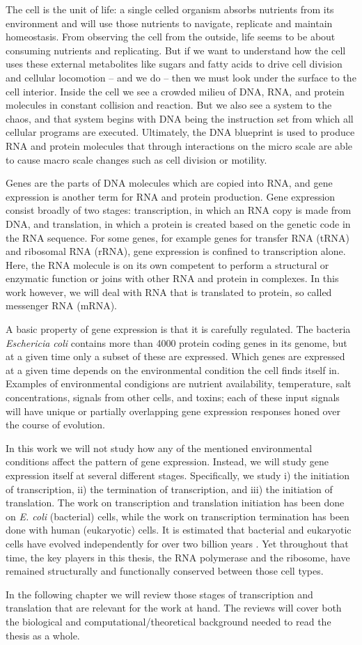%

The cell is the unit of life: a single celled organism absorbs nutrients from
its environment and will use those nutrients to navigate, replicate and
maintain homeostasis. From observing the cell from the outside, life seems to
be about consuming nutrients and replicating. But if we want to understand how
the cell uses these external metabolites like sugars and fatty acids to drive
cell division and cellular locomotion -- and we do -- then we must look under
the surface to the cell interior. Inside the cell we see a crowded milieu of
DNA, RNA, and protein molecules in constant collision and reaction. But we also
see a system to the chaos, and that system begins with DNA being the
instruction set from which all cellular programs are executed. Ultimately, the
DNA blueprint is used to produce RNA and protein molecules that through
interactions on the micro scale are able to cause macro scale changes such as
cell division or motility.

Genes are the parts of DNA molecules which are copied into RNA, and gene
expression is another term for RNA and protein production. Gene expression
consist broadly of two stages: transcription, in which an RNA copy is made from
DNA, and translation, in which a protein is created based on the genetic code
in the RNA sequence. For some genes, for example genes for transfer RNA (tRNA)
and ribosomal RNA (rRNA), gene expression is confined to transcription alone.
Here, the RNA molecule is on its own competent to perform a structural or
enzymatic function or joins with other RNA and protein in complexes. In this
work however, we will deal with RNA that is translated to protein, so called
messenger RNA (mRNA).

A basic property of gene expression is that it is carefully regulated. The
bacteria \textit{Eschericia coli} contains more than 4000 protein coding genes
in its genome, but at a given time only a subset of these are expressed. Which
genes are expressed at a given time depends on the environmental condition the
cell finds itself in. Examples of environmental condigions are nutrient
availability, temperature, salt concentrations, signals from other cells, and
toxins; each of these input signals will have unique or partially overlapping
gene expression responses honed over the course of evolution.

In this work we will not study how any of the mentioned environmental
conditions affect the pattern of gene expression. Instead, we will study gene
expression itself at several different stages. Specifically, we study i) the
initiation of transcription, ii) the termination of transcription, and iii) the
initiation of translation. The work on transcription and translation initiation
has been done on \textit{E. coli} (bacterial) cells, while the work on
transcription termination has been done with human (eukaryotic) cells. It is
estimated that bacterial and eukaryotic cells have evolved independently for
over two billion years \cite{vellai_origin_1999}. Yet throughout that time, the
key players in this thesis, the RNA polymerase and the ribosome, have remained
structurally and functionally conserved between those cell types.

In the following chapter we will review those stages of transcription and
translation that are relevant for the work at hand. The reviews will cover both
the biological and computational/theoretical background needed to read the
thesis as a whole.
